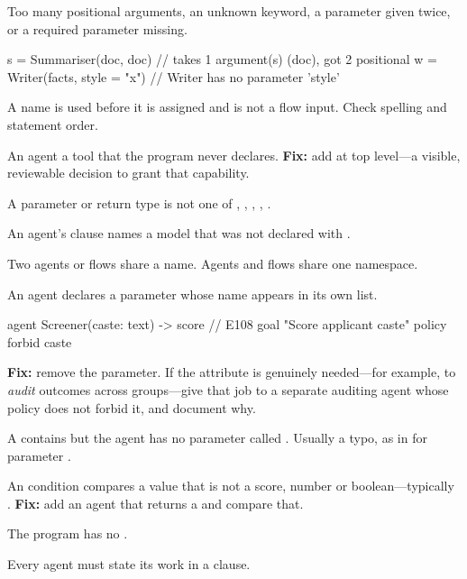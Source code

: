 Too many positional arguments, an unknown keyword, a parameter given twice, or a required parameter missing.
\begin{algo}
s = Summariser(doc, doc)        // takes 1 argument(s) (doc), got 2 positional
w = Writer(facts, style = "x")  // Writer has no parameter 'style'
\end{algo}

A name is used before it is assigned and is not a flow input. Check spelling and statement order.

An agent  a tool that the program never declares. \textbf{Fix:} add  at top level---a visible, reviewable decision to grant that capability.

A parameter or return type is not one of , , , , .

An agent's  clause names a model that was not declared with .

Two agents or flows share a name. Agents and flows share one namespace.

An agent declares a parameter whose name appears in its own  list.
\begin{algo}
agent Screener(caste: text) -> score {   // E108
    goal "Score applicant {caste}"
    policy { forbid caste }
}
\end{algo}
\textbf{Fix:} remove the parameter. If the attribute is genuinely needed---for example, to \emph{audit} outcomes across groups---give that job to a separate auditing agent whose policy does not forbid it, and document why.

A  contains  but the agent has no parameter called . Usually a typo, as in  for parameter .

An  condition compares a value that is not a score, number or boolean---typically . \textbf{Fix:} add an agent that returns a  and compare that.

The program has no .

Every agent must state its work in a  clause.

